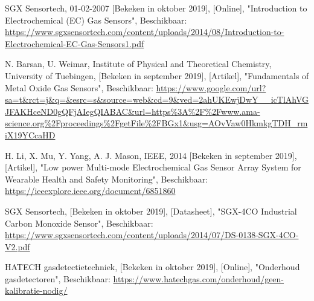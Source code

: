 \documentclass[a4paper, 11pt]{article} %
\begin{document}
\begin{thebibliography}{9}
		SGX Sensortech,
		01-02-2007 [Bekeken in oktober 2019],
		[Online],
		"Introduction to Electrochemical (EC) Gas Sensors",
		Beschikbaar: \url{https://www.sgxsensortech.com/content/uploads/2014/08/Introduction-to-Electrochemical-EC-Gas-Sensors1.pdf}
		
		N. Barsan, U. Weimar,
		Institute of Physical and Theoretical Chemistry, University of Tuebingen,
		[Bekeken in september 2019],
		[Artikel],
		"Fundamentals of Metal Oxide Gas Sensors",
		Beschikbaar: \url{https://www.google.com/url?sa=t\&rct=j\&q=&esrc=s\&source=web\&cd=9\&ved=2ahUKEwjDwY__icTlAhVGJFAKHceND0gQFjAIegQIABAC\&url=https%3A%2F%2Fwww.ama-science.org%2Fproceedings%2FgetFile%2FBGx1&usg=AOvVaw0HkmkgTDH_rmiX19YCcaHD}
		
		\newpage
		H. Li, X. Mu, Y. Yang, A. J. Mason,
		IEEE,
		2014 [Bekeken in september 2019],
		[Artikel],
		"Low power Multi-mode Electrochemical Gas
		Sensor Array System for Wearable Health and
		Safety Monitoring",
		Beschikbaar: \url{https://ieeexplore.ieee.org/document/6851860}
		
		SGX Sensortech,
		[Bekeken in oktober 2019],
		[Datasheet],
		"SGX-4CO Industrial Carbon Monoxide Sensor",
		Beschikbaar: \url{https://www.sgxsensortech.com/content/uploads/2014/07/DS-0138-SGX-4CO-V2.pdf}

		HATECH gasdetectietechniek,
		[Bekeken in oktober 2019],
		[Online],
		"Onderhoud gasdetectoren",
		Beschikbaar: \url{https://www.hatechgas.com/onderhoud/geen-kalibratie-nodig/}	
		
	\end{thebibliography}
\end{document}
